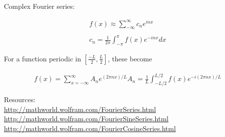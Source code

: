 \documentclass[11pt]{article}
\begin{document}
\begin{enumerate}
Complex Fourier series:

\begin{align*}
     f(x) \approx \sum_{-\infty}^{\infty} c_{n}e^{inx} \\\\
     c_{n} = \frac{1}{2 \pi} \int_{-\pi}^{\pi} f(x) e^{-inx}dx
\end{align*}


For a function periodic in $[\frac{-L}{2},\frac{L}{2}]$, these become

\begin{align*}
    f(x) = \sum_{x= -\infty}^{\infty} A_{n}e^{(2 \pi n x)/L}
    A_{n} = \frac{1}{L}\int_{-L/2}^{L/2} f(x) e^{-i(2 \pi n x)/L}
\end{align*}


Resources:\\
\url{http://mathworld.wolfram.com/FourierSeries.html}\\
\url{http://mathworld.wolfram.com/FourierSineSeries.html}\\
\url{http://mathworld.wolfram.com/FourierCosineSeries.html}




\end{enumerate}
\end{document}
